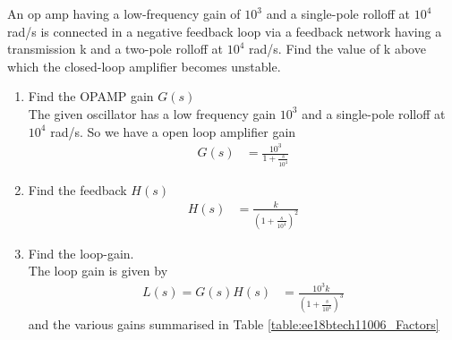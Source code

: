 An op amp having a low-frequency gain of $10^{3}$ and a single-pole rolloff at $10^{4}$ rad/s is connected in a negative feedback loop via a feedback network having a transmission k and a two-pole rolloff at $10^{4}$ rad/s. Find the value of k above which the closed-loop amplifier becomes unstable.
\begin{enumerate}[label=\arabic*.,ref=\theenumi]


\item Find the OPAMP gain $G(s)$
\\
\solution 
The given oscillator has a low frequency gain $10^3$ and a single-pole rolloff at $10^4$ rad/s. So we have a open loop amplifier gain 
\begin{align}
G(s)&= \frac{10^3}{1+\frac{s}{10^4}}
\end{align}
\item Find the feedback $H(s)$
\\
\solution 
\begin{align}
H(s)&= \frac{k}{\left(1+\frac{s}{10^4}\right)^2}   
\end{align}
%
\item Find the  loop-gain. 
\\
\solution The loop gain is given by 
\begin{align}
L(s) = G(s)H(s) &= \frac{10^3k}{\left(1+\frac{s}{10^4}\right)^3}
\end{align}
and the various gains summarised in Table \ref{table:ee18btech11006_Factors}


\end{enumerate}
